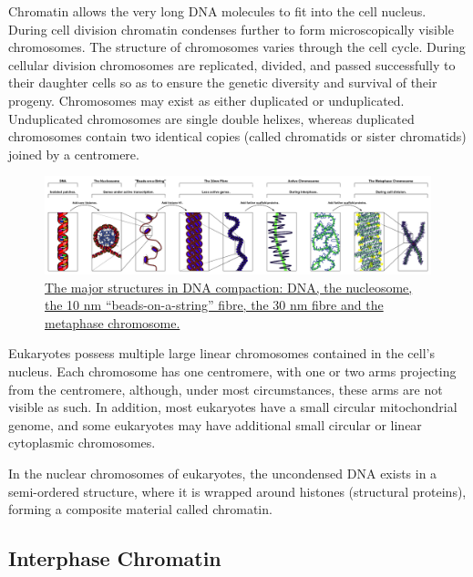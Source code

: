 Chromatin allows the very long DNA molecules to fit into the cell nucleus. During cell division chromatin condenses further to form microscopically visible chromosomes. The structure of chromosomes varies through the cell cycle. During cellular division chromosomes are replicated, divided, and passed successfully to their daughter cells so as to ensure the genetic diversity and survival of their progeny. Chromosomes may exist as either duplicated or unduplicated. Unduplicated chromosomes are single double helixes, whereas duplicated chromosomes contain two identical copies (called chromatids or sister chromatids) joined by a centromere.



\begin{figure}

{\centering \includegraphics[width=0.7\linewidth]{./figures/chromosomes/Chromatin_Structures} 

}

\caption{\href{https://commons.wikimedia.org/wiki/File:Chromatin_Structures.png}{The major structures in DNA compaction: DNA, the nucleosome, the 10 nm ``beads-on-a-string'' fibre, the 30 nm fibre and the metaphase chromosome.}}\label{fig:structure}
\end{figure}

Eukaryotes possess multiple large linear chromosomes contained in the cell's nucleus. Each chromosome has one centromere, with one or two arms projecting from the centromere, although, under most circumstances, these arms are not visible as such. In addition, most eukaryotes have a small circular mitochondrial genome, and some eukaryotes may have additional small circular or linear cytoplasmic chromosomes.

In the nuclear chromosomes of eukaryotes, the uncondensed DNA exists in a semi-ordered structure, where it is wrapped around histones (structural proteins), forming a composite material called chromatin.

\hypertarget{interphase-chromatin}{%
\subsection{Interphase Chromatin}\label{interphase-chromatin}}

